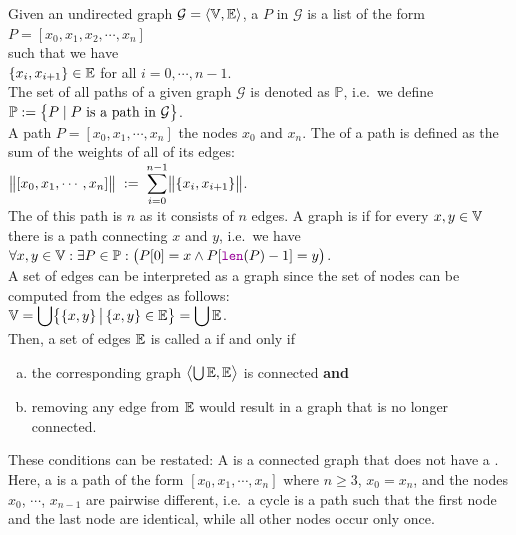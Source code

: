 \noindent
Given an undirected graph $\mathcal{G} = \langle {\mathbb V}, {\mathbb E} \rangle$, a  $P$
in $\mathcal{G}$ is a list of the form 
\\[0.2cm]
\hspace*{1.3cm} 
$P = [ x_0, x_1, x_2, \cdots, x_n ]$ 
\\[0.2cm]
such that we have \\[0.2cm]
\hspace*{1.3cm}
$\{x_i,x_{i+1}\} \in {\mathbb E}$  \quad for all $i = 0, \cdots, n-1$.
\\[0.2cm]
The set of all paths of a given graph $\mathcal{G}$ is denoted as $\mathbb{P}$, i.e.~we define
\\[0.2cm]
\hspace*{1.3cm}
$\displaystyle \mathbb{P}  := \bigl\{ P \mid \mbox{$P$ is a path in $\mathcal{G}$} \bigr\}$.
\\[0.2cm]
A path $P = [ x_0, x_1, \cdots, x_n]$  the nodes $x_0$ and $x_n$.  The  of a
path is defined as
the sum of the weights of all of its edges:
\\[0.2cm]
\hspace*{1.3cm}
 $\displaystyle\bigl\|[x_0,x_1, \cdots, x_n]\bigr\| \;:=\; \sum\limits_{i=0}^{n-1} \bigl\|\{x_i,x_{i+1}\}\bigr\|$.
\\[0.2cm]
The  of this path is $n$ as it consists of $n$ edges.
A graph is  if for every $x,y \in {\mathbb V}$ there is a path connecting $x$ and $y$, i.e.~we have
\\[0.2cm]
\hspace*{1.3cm}
$\forall x, y \in \mathbb{V}: \exists P \in \mathbb{P}: \bigl(P[0] = x \wedge P[\mytt{len}(P)-1] = y\bigr)$.
\\[0.2cm]
A set of edges can be interpreted as a graph since the set of nodes can be computed from the edges as
follows: 
\\[0.2cm]
\hspace*{1.3cm}
$\displaystyle{\mathbb V} = \bigcup \bigl\{\{x,y\} \,\big|\, \{x,y\} \in {\mathbb E} \bigr\} = \bigcup {\mathbb E}$.
\\[0.2cm]
Then, a set of edges ${\mathbb E}$ is called a  if and only if
\begin{enumerate}[(a)]
\item the corresponding graph $\bigl\langle \bigcup {\mathbb E}, {\mathbb E}\bigr\rangle$ is connected \quad \textbf{and}
\item removing any edge from ${\mathbb E}$ would result in a graph that is no longer connected.
\end{enumerate}
These conditions can be restated: A  is a connected graph that does not have a .
Here, a  is a path of the form $[x_0, x_1, \cdots, x_n]$ where $n \geq 3$, $x_0 = x_n$, and the
nodes $x_0$, $\cdots$, $x_{n-1}$ are pairwise different, i.e.~a cycle is a path such that the first node and the
last node are identical, while all other nodes occur only once.

